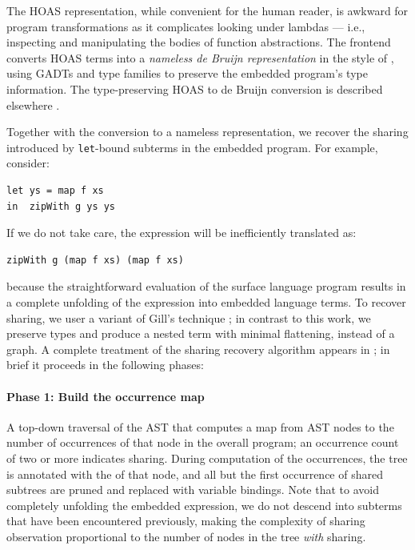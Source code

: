 The HOAS representation, while convenient for the human reader, is awkward for
program transformations as it complicates looking under lambdas --- i.e.,
inspecting and manipulating the bodies of function abstractions. The frontend
converts HOAS terms into a \emph{nameless de Bruijn representation}  in the style of \citet{Altenkirch:2003kz}, using GADTs \cite{Jones:2006}
and type families \cite{Chakravarty:2005a,Schrijvers:2008} to preserve the
embedded program's type information. The type-preserving HOAS to de Bruijn
conversion is described elsewhere \cite{Atkey:2009,Chakravarty:2009uo}.

Together with the conversion to a nameless representation, we recover the
sharing introduced by \texttt{let}-bound subterms in the embedded program. For
example, consider:
%
\begin{lstlisting}[style=Haskell]
let ys = map f xs
in  zipWith g ys ys
\end{lstlisting}
%
If we do not take care, the expression will be inefficiently translated as:
%
\begin{lstlisting}[style=Haskell]
zipWith g (map f xs) (map f xs)
\end{lstlisting}
%
because the straightforward evaluation of the surface language program results
in a complete unfolding of the expression into embedded language terms. To
recover sharing, we user a variant of Gill's technique \cite{Gill:2009}; in
contrast to this work, we preserve types and produce a nested term with minimal
flattening, instead of a graph. A complete treatment of the sharing recovery
algorithm appears in \derp; in brief it proceeds in the following phases:

\paragraph{Phase 1: Build the occurrence map}

A top-down traversal of the AST that computes a map from AST nodes to the number
of occurrences of that node in the overall program; an occurrence count of two
or more indicates sharing. During computation of the occurrences, the tree is
annotated with the  \cite{Jones:2000} of that node, and all
but the first occurrence of shared subtrees are pruned and replaced with
variable bindings. Note that to avoid completely unfolding the embedded
expression, we do not descend into subterms that have been encountered
previously, making the complexity of sharing observation proportional to the
number of nodes in the tree \emph{with} sharing.

